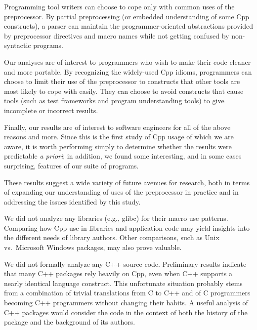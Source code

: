 \documentclass[10pt]{article}
\newcommand{\pkg}[1]{\textsf{#1}}
\begin{document}

Programming tool writers can choose to cope only with common uses of the
preprocessor.  By partial preprocessing (or embedded understanding of
some Cpp constructs), a parser can maintain the
programmer-oriented abstractions provided by preprocessor directives and
macro names while not getting confused by non-syntactic programs.

Our analyses are of interest to programmers who wish to make their code
cleaner and more portable.  By recognizing the widely-used Cpp idioms,
programmers can choose to limit their use of the preprocessor to
constructs that other tools are most likely to cope with easily.  They
can choose to avoid constructs that cause tools (such as test frameworks
and program understanding tools) to give incomplete or incorrect
results.


Finally, our results are of interest to software engineers for all of the
above reasons and more.  Since this is the first study of Cpp usage of
which we are aware, it is worth performing simply to determine whether the
results were predictable \emph{a priori}; in addition, we found
some interesting, and in some cases surprising, features of our suite of
programs.


 
These results suggest a wide variety of future avenues for research, both
in terms of expanding our understanding of uses of the preprocessor in
practice and in addressing the issues identified by this study.

We did not analyze any libraries (e.g., \pkg{glibc}) for their macro use
patterns.  Comparing how Cpp use in libraries and application code may
yield insights into the different needs of library authors.  Other
comparisons, such as Unix vs.~Microsoft Windows packages, may also prove
valuable.

We did not formally analyze any C++ source code.  Preliminary results
indicate that many C++ packages rely heavily on Cpp, even when C++ supports
a nearly identical language construct.  This unfortunate situation probably
stems from a combination of trivial translations from C to C++ and of C
programmers becoming C++ programmers without changing their habits.  A
useful analysis of C++ packages would consider the code in the context of
both the history of the package and the background of its authors.
\end{document}
